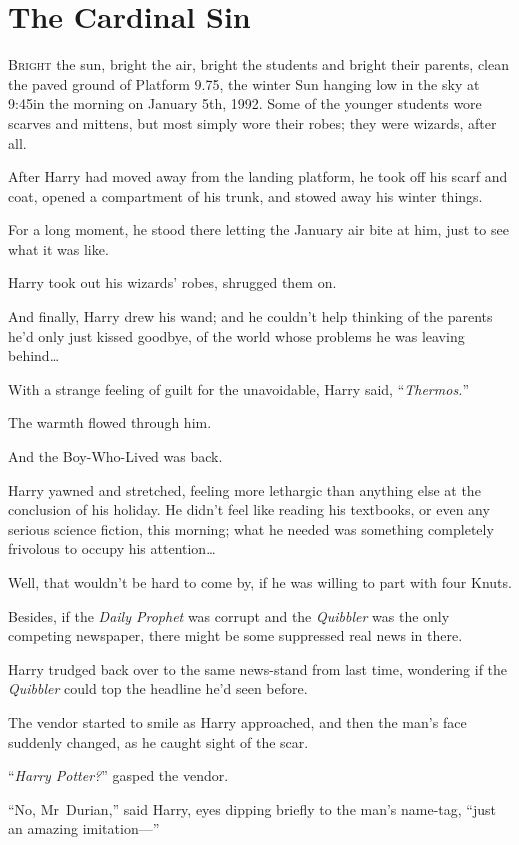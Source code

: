 \chapter{The Cardinal Sin}

\lettrine{B}{right} the sun, bright the air, bright the students and bright their parents, clean the paved ground of Platform 9.75, the winter Sun hanging low in the sky at 9:45\am in the morning on January 5th, 1992. Some of the younger students wore scarves and mittens, but most simply wore their robes; they were wizards, after all.

After Harry had moved away from the landing platform, he took off his scarf and coat, opened a compartment of his trunk, and stowed away his winter things.

For a long moment, he stood there letting the January air bite at him, just to see what it was like.

Harry took out his wizards’ robes, shrugged them on.

And finally, Harry drew his wand; and he couldn’t help thinking of the parents he’d only just kissed goodbye, of the world whose problems he was leaving behind…

With a strange feeling of guilt for the unavoidable, Harry said,
“\emph{Thermos.}”

The warmth flowed through him.

And the Boy-Who-Lived was back.

Harry yawned and stretched, feeling more lethargic than anything else at the conclusion of his holiday. He didn’t feel like reading his textbooks, or even any serious science fiction, this morning; what he needed was something completely frivolous to occupy his attention…

Well, that wouldn’t be hard to come by, if he was willing to part with four Knuts.

Besides, if the \emph{Daily Prophet} was corrupt and the \emph{Quibbler} was the only competing newspaper, there might be some suppressed real news in there.

Harry trudged back over to the same news-stand from last time, wondering if the \emph{Quibbler} could top the headline he’d seen before.

The vendor started to smile as Harry approached, and then the man’s face suddenly changed, as he caught sight of the scar.

“\emph{Harry Potter?}” gasped the vendor.

“No, Mr~Durian,” said Harry, eyes dipping briefly to the man’s name-tag, “just an amazing imitation—”

